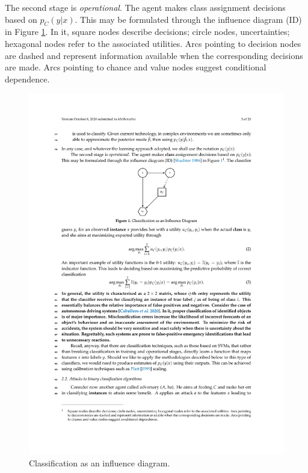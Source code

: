 The second stage is {\em operational}.
The agent makes class assignment decisions based on $p_C (y |x)$. %
This may be formulated through the influence diagram (ID)
\cite{evaluatingInfluenceDiagrams1986} in Figure \ref{fig:classification}. {In it, square nodes describe decisions; circle nodes, uncertainties; hexagonal nodes refer to the associated utilities. Arcs pointing to decision nodes are dashed and represent information available when the corresponding decisions are made. Arcs pointing to chance and value nodes suggest conditional dependence.}%
\begin{figure}[H]
\centering
\includegraphics[scale=1]{figures/1.pdf}
\caption{Classification as an influence diagram.} \label{fig:classification}
\end{figure}
